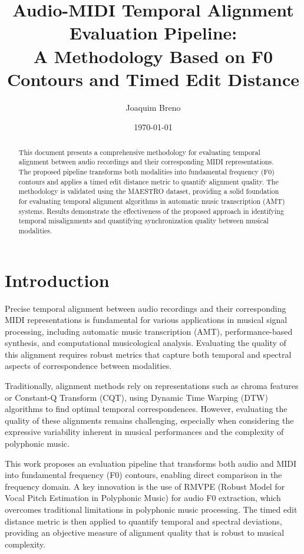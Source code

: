 \documentclass[12pt,a4paper]{article}
\title{Audio-MIDI Temporal Alignment Evaluation Pipeline: \\
A Methodology Based on F0 Contours and Timed Edit Distance}
\author{Joaquim Breno}
\date{\today}
\begin{document}
\maketitle

\begin{abstract}
This document presents a comprehensive methodology for evaluating temporal alignment between audio recordings and their corresponding MIDI representations. The proposed pipeline transforms both modalities into fundamental frequency (F0) contours and applies a timed edit distance metric to quantify alignment quality. The methodology is validated using the MAESTRO dataset, providing a solid foundation for evaluating temporal alignment algorithms in automatic music transcription (AMT) systems. Results demonstrate the effectiveness of the proposed approach in identifying temporal misalignments and quantifying synchronization quality between musical modalities.
\end{abstract}

\section{Introduction}
\label{sec:intro}

Precise temporal alignment between audio recordings and their corresponding MIDI representations is fundamental for various applications in musical signal processing, including automatic music transcription (AMT), performance-based synthesis, and computational musicological analysis. Evaluating the quality of this alignment requires robust metrics that capture both temporal and spectral aspects of correspondence between modalities.

Traditionally, alignment methods rely on representations such as chroma features or Constant-Q Transform (CQT), using Dynamic Time Warping (DTW) algorithms to find optimal temporal correspondences. However, evaluating the quality of these alignments remains challenging, especially when considering the expressive variability inherent in musical performances and the complexity of polyphonic music.

This work proposes an evaluation pipeline that transforms both audio and MIDI into fundamental frequency (F0) contours, enabling direct comparison in the frequency domain. A key innovation is the use of RMVPE (Robust Model for Vocal Pitch Estimation in Polyphonic Music) for audio F0 extraction, which overcomes traditional limitations in polyphonic music processing. The timed edit distance metric is then applied to quantify temporal and spectral deviations, providing an objective measure of alignment quality that is robust to musical complexity.
\end{document}
